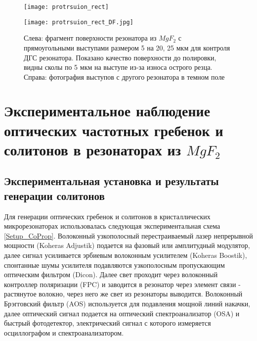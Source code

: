 \begin{figure}[ht]
  \begin{minipage}[ht]{0.49\linewidth}\centering
    \texttt{[image: protrsuion\_rect]}
  \end{minipage}
  \hfill
  \begin{minipage}[ht]{0.49\linewidth}\centering
    \texttt{[image: protrsuion\_rect\_DF.jpg]}
  \end{minipage}
  \caption{Слева: фрагмент поверхности резонатора из $MgF_2$ с прямоугольными выступами размером 5 на 20, 25 мкм для контроля ДГС резонатора. Показано качество поверхности до полировки, видны сколы по 5 мкм на выступе из-за износа острого резца. Справа: фотография выступов с другого резонатора в темном поле}
  \label{protrsuion_rect}
\end{figure}



\section{Экспериментальное наблюдение оптических частотных гребенок и солитонов в резонаторах из $MgF_2$}


\subsection{Экспериментальная установка и результаты генерации солитонов}

Для генерации оптических гребенок и солитонов в кристаллических микрорезонаторах использовалась следующая экспериментальная схема \ref{Setup_CoProp}. Волоконный узкополосный перестраиваемый лазер непрерывной мощности (Koheras Adjustik) подается на фазовый или амплитудный модулятор, далее сигнал усиливается эрбиевым волоконным усилителем (Koheras Boostik), спонтанные шумы усилителя подавляются узкополосным пропускающим оптическим фильтром (Dicon). Далее свет проходит через волоконный контроллер поляризации (FPC) и заводится в резонатор через элемент связи - растянутое волокно, через него же свет из резонаторы выводится. Волоконный Брэгговский фильтр (AOS) используется для подавления мощной линий накачки, далее оптический сигнал подается на оптический спектроанализатор (OSA) и быстрый фотодетектор, электрический сигнал с которого измеряется осциллографом и спектроанализатором.

